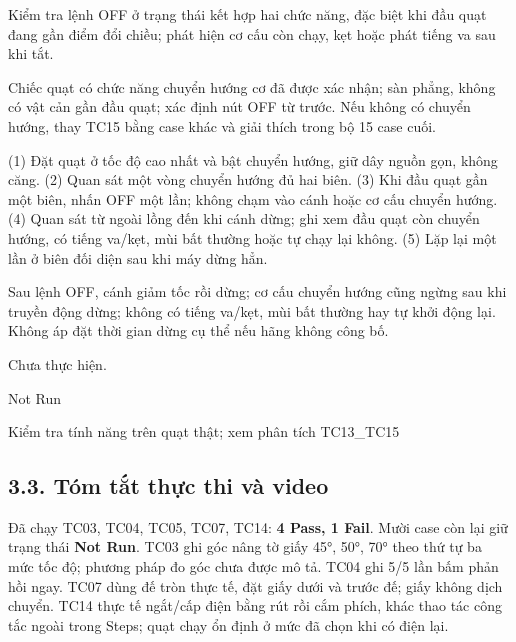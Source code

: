 \begin{description}
\tightlist
\item[Objective]
Kiểm tra lệnh OFF ở trạng thái kết hợp hai chức năng, đặc biệt khi đầu quạt đang gần điểm đổi chiều; phát hiện cơ cấu còn chạy, kẹt hoặc phát tiếng va sau khi tắt.
\item[Input]
Chiếc quạt có chức năng chuyển hướng cơ đã được xác nhận; sàn phẳng, không có vật cản gần đầu quạt; xác định nút OFF từ trước. Nếu không có chuyển hướng, thay TC15 bằng case khác và giải thích trong bộ 15 case cuối.
\item[Steps]
(1) Đặt quạt ở tốc độ cao nhất và bật chuyển hướng, giữ dây nguồn gọn, không căng. (2) Quan sát một vòng chuyển hướng đủ hai biên. (3) Khi đầu quạt gần một biên, nhấn OFF một lần; không chạm vào cánh hoặc cơ cấu chuyển hướng. (4) Quan sát từ ngoài lồng đến khi cánh dừng; ghi xem đầu quạt còn chuyển hướng, có tiếng va/kẹt, mùi bất thường hoặc tự chạy lại không. (5) Lặp lại một lần ở biên đối diện sau khi máy dừng hẳn.
\item[Expected]
Sau lệnh OFF, cánh giảm tốc rồi dừng; cơ cấu chuyển hướng cũng ngừng sau khi truyền động dừng; không có tiếng va/kẹt, mùi bất thường hay tự khởi động lại. Không áp đặt thời gian dừng cụ thể nếu hãng không công bố.
\item[Actual]
Chưa thực hiện.
\item[Verdict]
Not Run
\item[Ghi chú rà soát]
Kiểm tra tính năng trên quạt thật; xem phân tích TC13\_TC15
\end{description}

\subsection{3.3. Tóm tắt thực thi và video}\label{tuxf3m-tux1eaft-thux1ef1c-thi-vuxe0-video}

Đã chạy TC03, TC04, TC05, TC07, TC14: \textbf{4 Pass, 1 Fail}. Mười case còn lại giữ trạng thái \textbf{Not Run}. TC03 ghi góc nâng tờ giấy 45°, 50°, 70° theo thứ tự ba mức tốc độ; phương pháp đo góc chưa được mô tả. TC04 ghi 5/5 lần bấm phản hồi ngay. TC07 dùng đế tròn thực tế, đặt giấy dưới và trước đế; giấy không dịch chuyển. TC14 thực tế ngắt/cấp điện bằng rút rồi cắm phích, khác thao tác công tắc ngoài trong Steps; quạt chạy ổn định ở mức đã chọn khi có điện lại.

